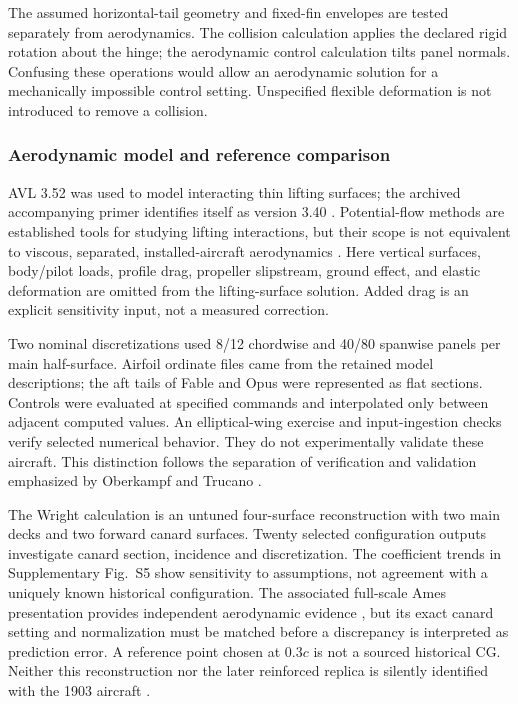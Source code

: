 \documentclass[11pt,a4paper]{article}
\begin{document}
The assumed horizontal-tail geometry and fixed-fin envelopes are tested separately from aerodynamics. The collision calculation applies the declared rigid rotation about the hinge; the aerodynamic control calculation tilts panel normals. Confusing these operations would allow an aerodynamic solution for a mechanically impossible control setting. Unspecified flexible deformation is not introduced to remove a collision.

\subsubsection{Aerodynamic model and reference comparison}
AVL 3.52 was used to model interacting thin lifting surfaces; the archived accompanying primer identifies itself as version 3.40 \cite{ref20}. Potential-flow methods are established tools for studying lifting interactions, but their scope is not equivalent to viscous, separated, installed-aircraft aerodynamics \cite{ref21,ref22}. Here vertical surfaces, body/pilot loads, profile drag, propeller slipstream, ground effect, and elastic deformation are omitted from the lifting-surface solution. Added drag is an explicit sensitivity input, not a measured correction.

Two nominal discretizations used 8/12 chordwise and 40/80 spanwise panels per main half-surface. Airfoil ordinate files came from the retained model descriptions; the aft tails of Fable and Opus were represented as flat sections. Controls were evaluated at specified commands and interpolated only between adjacent computed values. An elliptical-wing exercise and input-ingestion checks verify selected numerical behavior. They do not experimentally validate these aircraft. This distinction follows the separation of verification and validation emphasized by Oberkampf and Trucano \cite{ref24}.

The Wright calculation is an untuned four-surface reconstruction with two main decks and two forward canard surfaces. Twenty selected configuration outputs investigate canard section, incidence and discretization. The coefficient trends in Supplementary Fig.~S5 show sensitivity to assumptions, not agreement with a uniquely known historical configuration. The associated full-scale Ames presentation provides independent aerodynamic evidence \cite{ref13}, but its exact canard setting and normalization must be matched before a discrepancy is interpreted as prediction error. A reference point chosen at $0.3c$ is not a sourced historical CG. Neither this reconstruction nor the later reinforced replica is silently identified with the 1903 aircraft \cite{ref12}.
\end{document}
